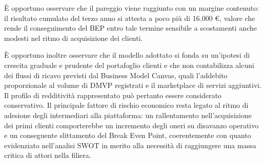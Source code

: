 \`E opportuno osservare che il pareggio viene raggiunto con un margine contenuto: il risultato cumulato del terzo anno si attesta a poco pi\`u di 16.000 \euro{}, valore che rende il conseguimento del BEP entro tale termine sensibile a scostamenti anche modesti nel ritmo di acquisizione dei clienti.

\`E opportuno inoltre osservare che il modello adottato si fonda su un'ipotesi di crescita graduale e prudente del portafoglio clienti e che non contabilizza alcuni dei flussi di ricavo previsti dal Business Model Canvas, quali l'addebito proporzionale al volume di DMVP registrati e il marketplace di servizi aggiuntivi. Il profilo di redditivit\`a rappresentato pu\`o pertanto essere considerato conservativo. Il principale fattore di rischio economico resta legato al ritmo di adesione degli intermediari alla piattaforma: un rallentamento nell'acquisizione dei primi clienti comporterebbe un incremento degli oneri su disavanzo operativo e un conseguente slittamento del Break Even Point, coerentemente con quanto evidenziato nell'analisi SWOT in merito alla necessit\`a di raggiungere una massa critica di attori nella filiera.